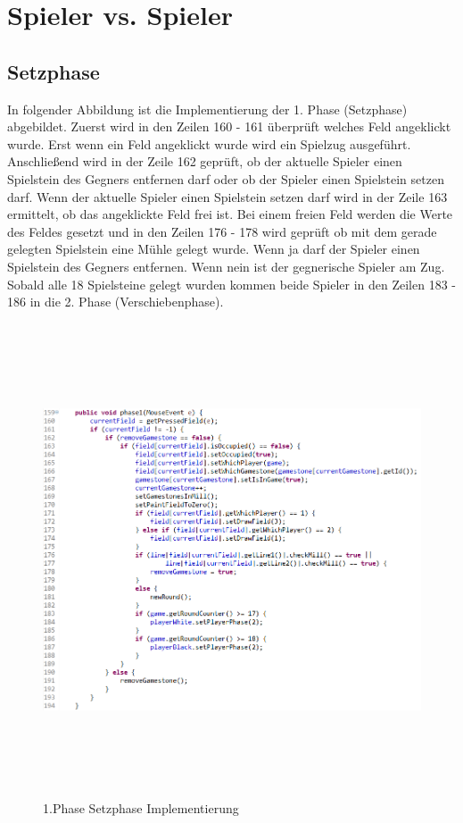 \documentclass[oneside]{ausarbeitung}
\begin{document}
\clearpage

\section{Spieler vs. Spieler}

\subsection{Setzphase}

In folgender Abbildung ist die Implementierung der 1. Phase (Setzphase) abgebildet. Zuerst wird in den Zeilen 160 - 161 überprüft welches Feld angeklickt wurde. Erst wenn ein Feld angeklickt wurde wird ein Spielzug ausgeführt. Anschließend wird in der Zeile 162 geprüft, ob der aktuelle Spieler einen Spielstein des Gegners entfernen darf oder ob der Spieler einen Spielstein setzen darf. Wenn der aktuelle Spieler einen Spielstein setzen darf wird in der Zeile 163 ermittelt, ob das angeklickte Feld frei ist. Bei einem freien Feld werden die Werte des Feldes gesetzt und in den Zeilen 176 - 178 wird geprüft ob mit dem gerade gelegten Spielstein eine Mühle gelegt wurde. Wenn ja darf der Spieler einen Spielstein des Gegners entfernen. Wenn nein ist der gegnerische Spieler am Zug. Sobald alle 18 Spielsteine gelegt wurden kommen beide Spieler in den Zeilen 183 - 186 in die 2. Phase (Verschiebenphase).

\begin{figure}[ht]
	\centering
	\includegraphics[width=17cm,height=14cm]{images/setzphaseImplementierung.png}
	\caption[1. Phase Setzphase Implementierung]{1.Phase Setzphase Implementierung}
\end{figure}
\end{document}
